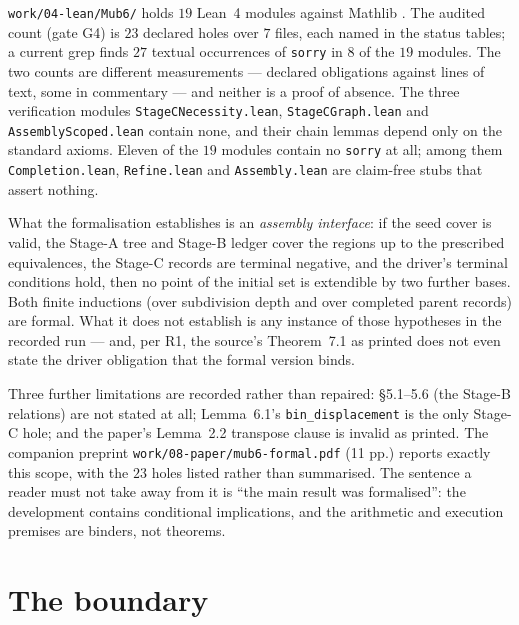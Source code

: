 \documentclass[10pt]{article}
\theoremstyle{definition}
\newcommand{\file}[1]{\texttt{\small #1}}
\begin{document}
\file{work/\allowbreak{}04-\allowbreak{}lean/\allowbreak{}Mub6/\allowbreak{}} holds $19$ Lean~4 modules against Mathlib \cite{lean4}. The audited count (gate G4) is
$23$ declared holes over $7$ files, each named in the status tables; a current grep finds $27$
textual occurrences of \texttt{sorry} in $8$ of the $19$ modules. The two counts are different measurements --- declared
obligations against lines of text, some in commentary --- and neither is a proof of absence.
The three verification modules \file{StageCNecessity.lean}, \file{StageCGraph.lean} and
\file{AssemblyScoped.lean} contain none, and their chain lemmas depend only on the standard axioms.
Eleven of the $19$ modules contain no \texttt{sorry} at all; among them \file{Completion.lean},
\file{Refine.lean} and \file{Assembly.lean} are claim-free stubs that assert nothing.

What the formalisation establishes is an \emph{assembly interface}: if the seed cover is valid, the
Stage-A tree and Stage-B ledger cover the regions up to the prescribed equivalences, the Stage-C
records are terminal negative, and the driver's terminal conditions hold, then no point of the initial
set is extendible by two further bases. Both finite inductions (over subdivision depth and over
completed parent records) are formal. What it does not establish is any instance of those hypotheses in
the recorded run --- and, per R1, the source's Theorem~7.1 as printed does not even state the driver
obligation that the formal version binds.

Three further limitations are recorded rather than repaired: \S5.1--5.6 (the Stage-B relations) are
not stated at all; Lemma~6.1's \texttt{bin\_displacement} is the only Stage-C hole; and the paper's
Lemma~2.2 transpose clause is invalid as printed. The companion preprint \file{work/\allowbreak{}08-\allowbreak{}paper/\allowbreak{}mub6-\allowbreak{}formal.pdf}
(11 pp.) reports exactly this scope, with the $23$ holes listed rather than summarised. The sentence a
reader must not take away from it is ``the main result was formalised'': the development contains
conditional implications, and the arithmetic and execution premises are binders, not theorems.

\section{The boundary}\label{sec:bound}
\end{document}
